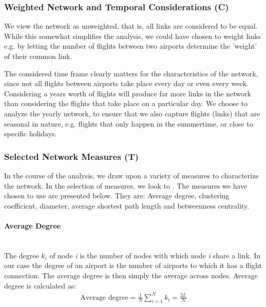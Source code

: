 \subsubsection{Weighted Network and Temporal Considerations (C)}
We view the network as unweighted, that is, all links are considered to be equal. While this somewhat simplifies the analysis, we could have chosen to weight links e.g. by letting the number of flights between two airports determine the 'weight' of their common link.
\par
The considered time frame clearly matters for the characteristics of the network, since not all flights between airports take place every day or even every week. Considering a years worth of flights will produce far more links in the network than considering the flights that take place on a particular day. We choose to analyze the yearly network, to ensure that we also capture flights (links) that are seasonal in nature, e.g. flights that only happen in the summertime, or close to specific holidays.

\subsubsection{Selected Network Measures (T)}
In the course of the analysis, we draw upon a variety of measures to characterize the network. In the selection of measures, we look to \citet{chi2004structural}. The measures we have chosen to use are presented below. They are: Average degree, clustering coefficient, diameter, average shortest path length and betweenness centrality.

\paragraph{Average Degree}\mbox{} \\
The degree $k_i$ of node \textit{i} is the number of nodes with which node \textit{i} share a link. In our case the degree of an airport is the number of airports to which it has a flight connection. The average degree is then simply the average across nodes. Average degree is calculated as: 
\begin{align}
    \text{Average degree} = \frac{1}{N} \sum_{i = 1}^N k_i = \frac{2L}{N}
\end{align}

